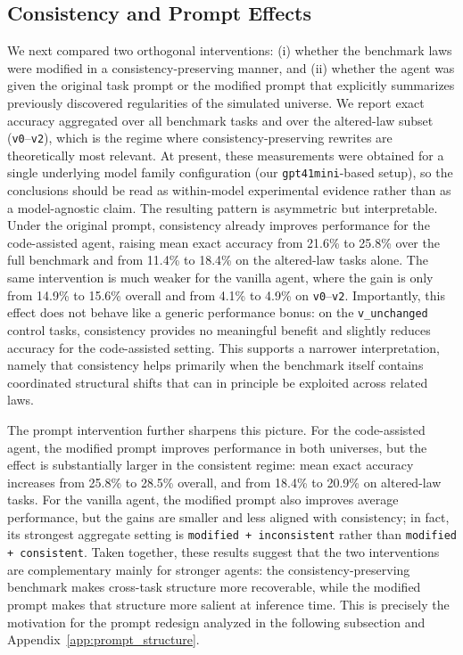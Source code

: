 \subsection{Consistency and Prompt Effects}
\label{sec:consistency_prompt_results}

We next compared two orthogonal interventions: (i) whether the benchmark laws were modified in a consistency-preserving manner, and (ii) whether the agent was given the original task prompt or the modified prompt that explicitly summarizes previously discovered regularities of the simulated universe. We report exact accuracy aggregated over all benchmark tasks and over the altered-law subset (\texttt{v0}--\texttt{v2}), which is the regime where consistency-preserving rewrites are theoretically most relevant. At present, these measurements were obtained for a single underlying model family configuration (our \texttt{gpt41mini}-based setup), so the conclusions should be read as within-model experimental evidence rather than as a model-agnostic claim. The resulting pattern is asymmetric but interpretable. Under the original prompt, consistency already improves performance for the code-assisted agent, raising mean exact accuracy from 21.6\% to 25.8\% over the full benchmark and from 11.4\% to 18.4\% on the altered-law tasks alone. The same intervention is much weaker for the vanilla agent, where the gain is only from 14.9\% to 15.6\% overall and from 4.1\% to 4.9\% on \texttt{v0}--\texttt{v2}. Importantly, this effect does not behave like a generic performance bonus: on the \texttt{v\_unchanged} control tasks, consistency provides no meaningful benefit and slightly reduces accuracy for the code-assisted setting. This supports a narrower interpretation, namely that consistency helps primarily when the benchmark itself contains coordinated structural shifts that can in principle be exploited across related laws.

The prompt intervention further sharpens this picture. For the code-assisted agent, the modified prompt improves performance in both universes, but the effect is substantially larger in the consistent regime: mean exact accuracy increases from 25.8\% to 28.5\% overall, and from 18.4\% to 20.9\% on altered-law tasks. For the vanilla agent, the modified prompt also improves average performance, but the gains are smaller and less aligned with consistency; in fact, its strongest aggregate setting is \texttt{modified + inconsistent} rather than \texttt{modified + consistent}. Taken together, these results suggest that the two interventions are complementary mainly for stronger agents: the consistency-preserving benchmark makes cross-task structure more recoverable, while the modified prompt makes that structure more salient at inference time. This is precisely the motivation for the prompt redesign analyzed in the following subsection and Appendix~\ref{app:prompt_structure}.

